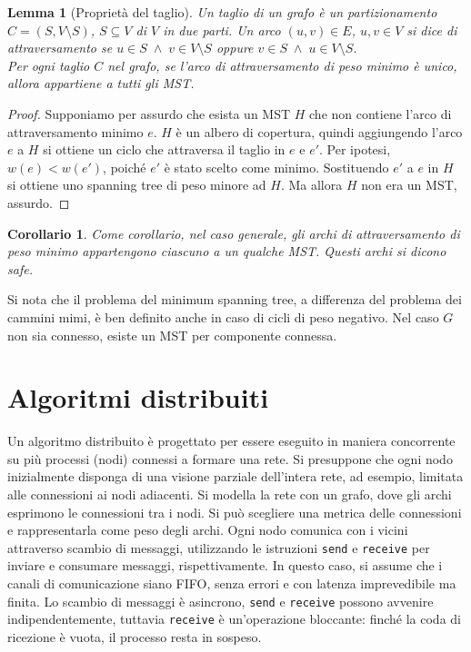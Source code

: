 \documentclass[target=bach,aauheader=,style=]{thud}
\newcommand{\eng}[1]{\foreignlanguage{english}{#1}}
\newtheorem{lemma}{Lemma}
\newtheorem{corollary}{Corollario}[lemma]
\begin{document}
\begin{lemma}[Proprietà del taglio]\label{mst:cut}
Un taglio di un grafo è un partizionamento $C=(S,V\setminus S)$, $S\subseteq V$ di $V$ in due parti. Un arco $(u,v)\in E$, $u,v\in V$ si dice di attraversamento se $u\in S\;\land\;v\in V\setminus S$ oppure $v\in S\;\land\;u\in V\setminus S$.\\
Per ogni taglio $C$ nel grafo, se l'arco di attraversamento di peso minimo è unico, allora appartiene a tutti gli MST.
\end{lemma}
\begin{proof}
Supponiamo per assurdo che esista un MST $H$ che non contiene l'arco di attraversamento minimo $e$. $H$ è un albero di copertura, quindi aggiungendo l'arco $e$ a $H$ si ottiene un ciclo che attraversa il taglio in $e$ e $e'$. Per ipotesi, $w(e)<w(e')$, poiché $e'$ è stato scelto come minimo. Sostituendo $e'$ a $e$ in $H$ si ottiene uno \eng{spanning tree} di peso minore ad $H$. Ma allora $H$ non era un MST, assurdo.
\end{proof}
\begin{corollary}
Come corollario, nel caso generale, gli archi di attraversamento di peso minimo appartengono ciascuno a un qualche MST. Questi archi si dicono \emph{\eng{safe}}.
\end{corollary}

Si nota che il problema del \eng{minimum spanning tree}, a differenza del problema dei cammini mimi, è ben definito anche in caso di cicli di peso negativo.
Nel caso $G$ non sia connesso, esiste un MST per componente connessa. 

\section{Algoritmi distribuiti}\label{algs:distributed}
Un algoritmo distribuito è progettato per essere eseguito in maniera concorrente su più processi (nodi) connessi a formare una rete. Si presuppone che ogni nodo inizialmente disponga di una visione parziale dell'intera rete, ad esempio, limitata alle connessioni ai nodi adiacenti. Si modella la rete con un grafo, dove gli archi esprimono le connessioni tra i nodi. Si può scegliere una metrica delle connessioni e rappresentarla come peso degli archi. Ogni nodo comunica con i vicini attraverso scambio di messaggi, utilizzando le istruzioni \lstinline{send} e \lstinline{receive} per inviare e consumare messaggi, rispettivamente. In questo caso, si assume che i canali di comunicazione siano FIFO, senza errori e con latenza imprevedibile ma finita. Lo scambio di messaggi è asincrono, \lstinline{send} e \lstinline{receive} possono avvenire indipendentemente, tuttavia \lstinline{receive} è un'operazione bloccante: finché la coda di ricezione è vuota, il processo resta in sospeso.
\end{document}
